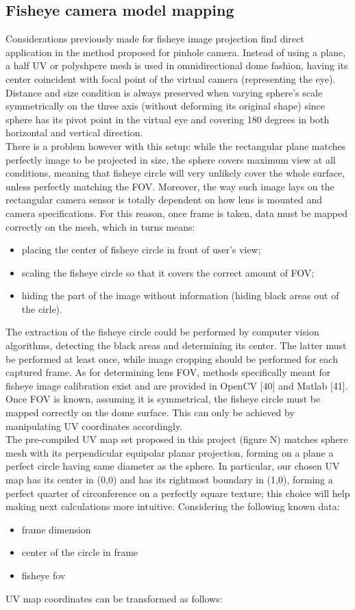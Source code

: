 \subsection{Fisheye camera model mapping}
Considerations previously made for fisheye image projection find direct application in the method proposed for pinhole camera. Instead of using a plane, a half UV or polyshpere mesh is used in omnidirectional dome fashion, having its center coincident with focal point of the virtual camera (representing the eye). Distance and size condition is always preserved when varying sphere’s scale symmetrically on the three axis (without deforming its original shape) since sphere has its pivot point in the virtual eye and covering 180 degrees in both horizontal and vertical direction.\\
There is a problem however with this setup: while the rectangular plane matches perfectly image to be projected in size, the sphere covers maximum view at all conditions, meaning that fisheye circle will very unlikely cover the whole surface, unless perfectly matching the FOV. Moreover, the way such image lays on the rectangular camera sensor is totally dependent on how lens is mounted and camera specifications. For this reason, once frame is taken, data must be mapped correctly on the mesh, which in turns means:
\begin{itemize}
\item placing the center of fisheye circle in front of user’s view;
\item scaling the fisheye circle so that it covers the correct amount of FOV;
\item hiding the part of the image without information (hiding black areas out of the cirle).
\end{itemize}
The extraction of the fisheye circle could be performed by computer vision algorithms, detecting the black areas and determining its center. The latter must be performed at least once, while image cropping should be performed for each captured frame. As for determining lens FOV, methods specifically meant for fisheye image calibration exist and are provided in OpenCV [40] and Matlab [41]. Once FOV is known, assuming it is symmetrical, the fisheye circle must be mapped correctly on the dome surface. This can only be achieved by manipulating UV coordinates accordingly.\\
The pre-compiled UV map set proposed in this project (figure N) matches sphere mesh with its perpendicular equipolar planar projection, forming on a plane a perfect circle having same diameter as the sphere. In particular, our chosen UV map has its center in (0,0) and has its rightmost boundary in (1,0), forming a perfect quarter of circonference on a perfectly square texture; this choice will help making next calculations more intuitive. Considering the following known data:
\begin{itemize}
\item frame dimension
\item center of the circle in frame
\item fisheye fov
\end{itemize}
UV map coordinates can be transformed as follows:


